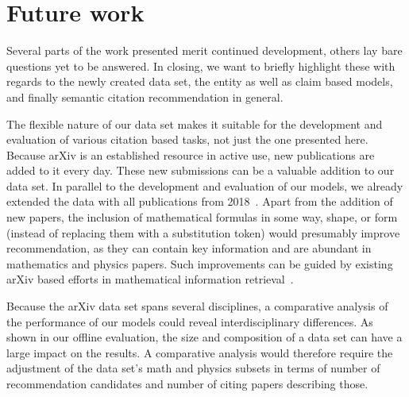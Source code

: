 \chapter{Future work}\label{chap:todo}
Several parts of the work presented merit continued development, others lay bare questions yet to be answered. In closing, we want to briefly highlight these with regards to the newly created data set, the entity as well as claim based models, and finally semantic citation recommendation in general.

The flexible nature of our data set makes it suitable for the development and evaluation of various citation based tasks, not just the one presented here. Because arXiv is an established resource in active use, new publications are added to it every day. These new submissions can be a valuable addition to our data set. In parallel to the development and evaluation of our models, we already extended the data with all publications from 2018~\cite{Saier2019}. Apart from the addition of new papers, the inclusion of mathematical formulas in some way, shape, or form (instead of replacing them with a substitution token) would presumably improve recommendation, as they can contain key information and are abundant in mathematics and physics papers. Such improvements can be guided by existing arXiv based efforts in mathematical information retrieval~\cite{Aizawa2014,Zanibbi2016}.

Because the arXiv data set spans several disciplines, a comparative analysis of the performance of our models could reveal interdisciplinary differences. As shown in our offline evaluation, the size and composition of a data set can have a large impact on the results. A comparative analysis would therefore require the adjustment of the data set's math and physics subsets in terms of number of recommendation candidates and number of citing papers describing those.

